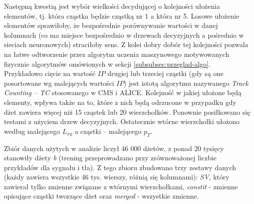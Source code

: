 Następną kwestią jest wybór wielkości decydującej o kolejności ułożenia elementów, tj. która cząstka będzie cząstką nr 1 a która nr 5. Losowe ułożenie elementów sprawiłoby, że bezpośrednie porównywanie wartości w danej kolumnach (co ma miejsce bezpośrednio w drzewach decyzyjnych a pośrednio w sieciach neuronowych) straciłoby sens. Z kolei dobry dobór tej kolejności pozwala na łatwe odtworzenie przez algorytm uczenia maszynowego motywowanych fizycznie algorytmów omówionych w sekcji \ref{subsubsec:przeglad-algo}. Przykładowo cięcie na wartość $IP$ drugiej lub trzeciej cząstki (gdy są one posortowane wg malejących wartości $IP$) jest istotą algorytmu nazywanego \textit{Track Counting -- TC} stosowanego w CMS i ALICE.
Kolejność w jakiej ułożone będą elementy, wpływa także na to, które z nich będą odrzucone w przypadku gdy dżet zawiera więcej niż 15 cząstek lub 20 wierzchołków. 
Ponownie posiłkowano się testami z użyciem drzew decyzyjnych. Ostatecznie wtórne wierzchołki ułożono według malejącego $L_{xy}$ a cząstki -- malejącego $p_T$.

Zbiór danych użytych w analizie liczył 46 000 dżetów, z ponad 20 tysięcy stanowiły dżety \textit{b} (trening przeprowadzano przy zrównoważonej liczbie przykładów dla sygnału i tła).
Z tego zbioru zbudowano trzy zestawy danych (każdy zawiera wszystkie 46 tys. wierszy, różnią się kolumnami): \textit{SV}, który zawierał tylko zmienne związane z wtórnymi wierzchołkami, \textit{constit} - zmienne opisujące cząstki tworzące dżet  oraz \textit{merged} - wszystkie zmienne.
